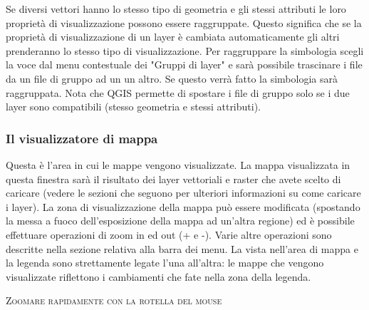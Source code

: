 Se diversi vettori hanno lo stesso tipo di geometria e gli stessi attributi le loro proprietà di visualizzazione
possono essere raggruppate. Questo significa che se la proprietà di visualizzazione di un
layer è cambiata automaticamente gli altri prenderanno lo stesso tipo di visualizzazione. Per raggruppare
la simbologia scegli la voce  dal menu contestuale dei "Gruppi di layer" e sarà
possibile trascinare i file da un file di gruppo ad un un altro. Se questo verrà fatto la simbologia sarà
raggruppata. Nota che QGIS permette di spostare i file di gruppo solo se i due layer sono compatibili
(stesso geometria e stessi attributi).

%

\subsubsection{Il visualizzatore di mappa}\label{label_mapview}

Questa è l’area in cui le mappe vengono visualizzate. La mappa visualizzata in questa finestra sarà
il risultato dei layer vettoriali e raster che avete scelto di caricare (vedere le sezioni che seguono
per ulteriori informazioni su come caricare i layer). La zona di visualizzazione della mappa può
essere modificata (spostando la messa a fuoco dell’esposizione della mappa ad un’altra regione) ed
è possibile effettuare operazioni di zoom in ed out (+ e -). Varie altre operazioni sono descritte nella
sezione relativa alla barra dei menu. La vista nell’area di mappa e la legenda sono strettamente
legate l’una all’altra: le mappe che vengono visualizzate riflettono i cambiamenti che fate nella zona
della legenda.  

\begin{Tip}\caption{\textsc{Zoomare rapidamente con la rotella del mouse}}
\end{Tip}

